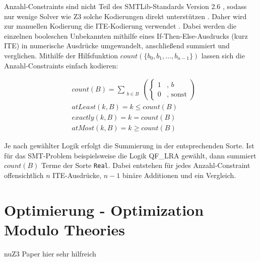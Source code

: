 Anzahl-Constraints sind nicht Teil des SMTLib-Standards Version 2.6 \cite{smtlib}, sodass nur wenige Solver wie Z3 solche Kodierungen direkt unterstützen \cite{z3Cardinality}.
Daher wird zur manuellen Kodierung  die ITE-Kodierung verwendet \cite{kovasznai}.
Dabei werden die einzelnen booleschen Unbekannten mithilfe eines If-Then-Else-Ausdrucks (kurz ITE) in numerische Ausdrücke umgewandelt, anschließend summiert und verglichen.
Mithilfe der Hilfsfunktion $count(\{b_0, b_1, \ldots, b_{n-1}\})$ lassen sich die Anzahl-Constraints einfach kodieren:

\[
    \begin{aligned}
        & count(B) = \sum_{\substack{b \in B}}
            \left(
                \begin{cases}
                    1 & \text{, } b \\
                    0 & \text{, sonst}
                \end{cases}
            \right) \\[5pt]
        & atLeast(k, B) = k \leq count(B) \\[5pt]
        & exactly(k, B) = k = count(B) \\[5pt]
        & atMost(k, B) = k \geq count(B)
    \end{aligned}
\]

Je nach gewählter Logik erfolgt die Summierung in der entsprechenden Sorte.
Ist für das SMT-Problem beispielsweise die Logik QF\_LRA gewählt, dann summiert $count(B)$ Terme der Sorte \texttt{Real}.
Dabei entstehen für jedes Anzahl-Constraint offensichtlich $n$ ITE-Ausdrücke, $n-1$ binäre Additionen und ein Vergleich.

\section{Optimierung - Optimization Modulo Theories}
nuZ3 Paper hier sehr hilfreich \cite{nuz3}